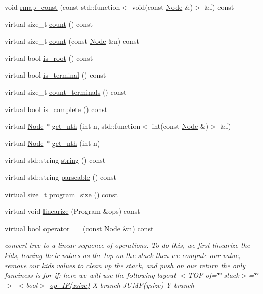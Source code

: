 \begin{DoxyCompactItemize}
void \hyperlink{class_node_a59da25cea338385d73b898b86492f97e}{rmap\+\_\+const} (const std\+::function$<$ void(const \hyperlink{class_node}{Node} \&)$>$ \&f) const
\item 
virtual size\+\_\+t \hyperlink{class_node_abd387b27e1deb45b789ad7b7abd8c6e6}{count} () const
\item 
virtual size\+\_\+t \hyperlink{class_node_a0cc58478d98361566830a8d3db745718}{count} (const \hyperlink{class_node}{Node} \&n) const
\item 
virtual bool \hyperlink{class_node_ad12a96da2fe796616aa22e20429f41d5}{is\+\_\+root} () const
\item 
virtual bool \hyperlink{class_node_ac3c263a4e0c734c34aaf62f80f84cd9a}{is\+\_\+terminal} () const
\item 
virtual size\+\_\+t \hyperlink{class_node_a70c820eaeaa852e3c0a46cf006026c1b}{count\+\_\+terminals} () const
\item 
virtual bool \hyperlink{class_node_ac2e36754ba8b1b1d452deeb2bdbd346f}{is\+\_\+complete} () const
\item 
virtual \hyperlink{class_node}{Node} $\ast$ \hyperlink{class_node_a93fc84b584f080593978d3a39631d3e5}{get\+\_\+nth} (int n, std\+::function$<$ int(const \hyperlink{class_node}{Node} \&)$>$ \&f)
\item 
virtual \hyperlink{class_node}{Node} $\ast$ \hyperlink{class_node_a224c0ee6dae35ddce70f8fd3b91e0b1c}{get\+\_\+nth} (int n)
\item 
virtual std\+::string \hyperlink{class_node_a0590ae269543416be9c4ebdf70bad73b}{string} () const
\item 
virtual std\+::string \hyperlink{class_node_a70e879ceb71f47787137572d9bee8efa}{parseable} () const
\item 
virtual size\+\_\+t \hyperlink{class_node_a377548bcf1be99ac5181f9434c33c81e}{program\+\_\+size} () const
\item 
virtual void \hyperlink{class_node_ac995508e96e112675fde53e7748e41bc}{linearize} (Program \&ops) const
\item 
virtual bool \hyperlink{class_node_a90aeee00ccda27f36bea9cdd774eae8d}{operator==} (const \hyperlink{class_node}{Node} \&n) const
\begin{DoxyCompactList}\small\item\em convert tree to a linear sequence of operations. To do this, we first linearize the kids, leaving their values as the top on the stack then we compute our value, remove our kids\textquotesingle{} values to clean up the stack, and push on our return the only fanciness is for if\+: here we will use the following layout $<$\+T\+O\+P of=\char`\"{}\char`\"{} stack$>$=\char`\"{}\char`\"{}$>$ $<$bool$>$ \hyperlink{_instruction_8h_af2fb7c87c5854c5733d7bb0506b06de7a8f69a9fe993189d72cf7b07e8517801d}{op\+\_\+\+I\+F(xsize)} X-\/branch J\+U\+M\+P(ysize) Y-\/branch \end{DoxyCompactList}\item 

\end{DoxyCompactItemize}
